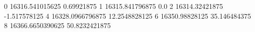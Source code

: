 0 16316.541015625 0.69921875
1 16315.841796875 0.0
2 16314.32421875 -1.517578125
4 16328.0966796875 12.2548828125
6 16350.98828125 35.146484375
8 16366.6650390625 50.8232421875
